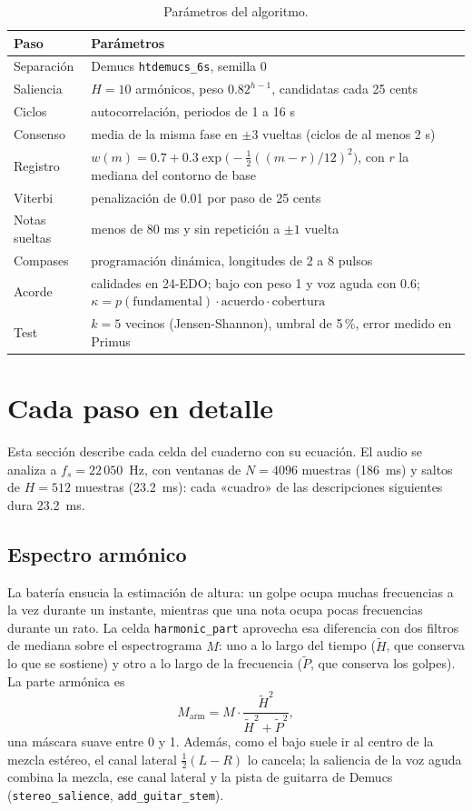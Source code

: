 \begin{table}[ht]
  \centering\small
  \caption{Parámetros del algoritmo.}\label{tab:parametros}
  \begin{tabularx}{\textwidth}{@{}l>{\raggedright\arraybackslash}X@{}}
    \toprule
    Paso & Parámetros \\
    \midrule
    Separación & Demucs \texttt{htdemucs\_6s}, semilla 0 \\
    Saliencia & $H = 10$ armónicos, peso $0.82^{h-1}$, candidatas cada 25 cents \\
    Ciclos & autocorrelación, periodos de 1 a 16 s \\
    Consenso & media de la misma fase en $\pm3$ vueltas (ciclos de al menos 2 s) \\
    Registro & $w(m) = 0.7 + 0.3 \exp\!\bigl(-\tfrac12 ((m - r)/12)^2\bigr)$, con $r$ la mediana del contorno de base \\
    Viterbi & penalización de 0.01 por paso de 25 cents \\
    Notas sueltas & menos de 80 ms y sin repetición a $\pm1$ vuelta \\
    Compases & programación dinámica, longitudes de 2 a 8 pulsos \\
    Acorde & 8 calidades en 24-EDO; bajo con peso 1 y voz aguda con 0.6;
      $\kappa = p(\text{fundamental}) \cdot \text{acuerdo} \cdot \text{cobertura}$ \\
    Test & $k = 5$ vecinos (Jensen-Shannon), umbral de 5\,\%, error medido en Primus \\
    \bottomrule
  \end{tabularx}
\end{table}

\section{Cada paso en detalle}\label{sec:pasos}

Esta sección describe cada celda del cuaderno con su ecuación. El audio se analiza a $f_s = 22\,050$~Hz, con ventanas de
$N = 4096$ muestras (186~ms) y saltos de $H = 512$ muestras (23.2~ms): cada «cuadro» de las descripciones siguientes dura
23.2~ms.

\subsection{Espectro armónico}

La batería ensucia la estimación de altura: un golpe ocupa muchas frecuencias a la vez durante un instante, mientras que
una nota ocupa pocas frecuencias durante un rato. La celda \texttt{harmonic\_part} aprovecha esa diferencia con dos filtros
de mediana sobre el espectrograma $M$: uno a lo largo del tiempo ($\tilde H$, que conserva lo que se sostiene) y otro a lo
largo de la frecuencia ($\tilde P$, que conserva los golpes). La parte armónica es
\[
  M_{\mathrm{arm}} = M \cdot \frac{\tilde H^2}{\tilde H^2 + \tilde P^2},
\]
una máscara suave entre 0 y 1. Además, como el bajo suele ir al centro de la mezcla estéreo, el canal lateral
$\tfrac12(L - R)$ lo cancela; la saliencia de la voz aguda combina la mezcla, ese canal lateral y la pista de guitarra de
Demucs (\texttt{stereo\_salience}, \texttt{add\_guitar\_stem}).

